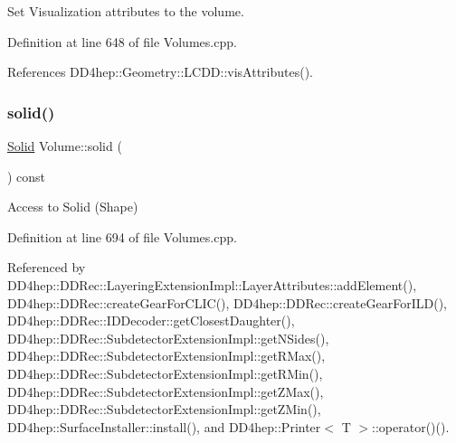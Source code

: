 Set Visualization attributes to the volume. 

Definition at line 648 of file Volumes.\+cpp.



References D\+D4hep\+::\+Geometry\+::\+L\+C\+D\+D\+::vis\+Attributes().

\hypertarget{class_d_d4hep_1_1_geometry_1_1_volume_a1138a74be0df117ce0835711b37efa33}{}\label{class_d_d4hep_1_1_geometry_1_1_volume_a1138a74be0df117ce0835711b37efa33} 
\subsubsection{\texorpdfstring{solid()}{solid()}}
{\footnotesize\ttfamily \hyperlink{namespace_d_d4hep_1_1_geometry_a83de90a8dcc7378ba47d54ef9a6a687b}{Solid} Volume\+::solid (\begin{DoxyParamCaption}{ }\end{DoxyParamCaption}) const}



Access to Solid (Shape) 



Definition at line 694 of file Volumes.\+cpp.



Referenced by D\+D4hep\+::\+D\+D\+Rec\+::\+Layering\+Extension\+Impl\+::\+Layer\+Attributes\+::add\+Element(), D\+D4hep\+::\+D\+D\+Rec\+::create\+Gear\+For\+C\+L\+I\+C(), D\+D4hep\+::\+D\+D\+Rec\+::create\+Gear\+For\+I\+L\+D(), D\+D4hep\+::\+D\+D\+Rec\+::\+I\+D\+Decoder\+::get\+Closest\+Daughter(), D\+D4hep\+::\+D\+D\+Rec\+::\+Subdetector\+Extension\+Impl\+::get\+N\+Sides(), D\+D4hep\+::\+D\+D\+Rec\+::\+Subdetector\+Extension\+Impl\+::get\+R\+Max(), D\+D4hep\+::\+D\+D\+Rec\+::\+Subdetector\+Extension\+Impl\+::get\+R\+Min(), D\+D4hep\+::\+D\+D\+Rec\+::\+Subdetector\+Extension\+Impl\+::get\+Z\+Max(), D\+D4hep\+::\+D\+D\+Rec\+::\+Subdetector\+Extension\+Impl\+::get\+Z\+Min(), D\+D4hep\+::\+Surface\+Installer\+::install(), and D\+D4hep\+::\+Printer$<$ T $>$\+::operator()().

\hypertarget{class_d_d4hep_1_1_geometry_1_1_volume_ab1e85c2a3a77ad8474f8be4d1e6ae8f8}{}\label{class_d_d4hep_1_1_geometry_1_1_volume_ab1e85c2a3a77ad8474f8be4d1e6ae8f8} 
